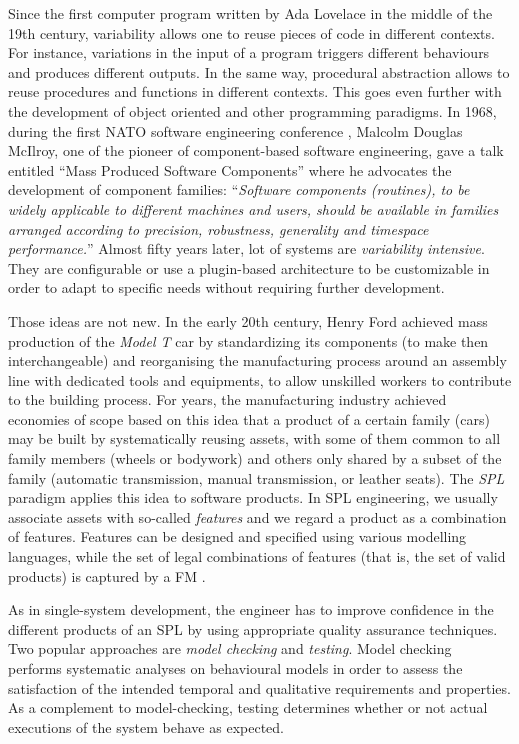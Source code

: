 
Since the first computer program written by Ada Lovelace in the middle of the 19th century, variability allows one to reuse pieces of code in different contexts. For instance, variations in the input of a program triggers different behaviours and produces different outputs. 
In the same way, procedural abstraction allows to reuse procedures and functions in different contexts. This goes even further with the development of object oriented and other programming paradigms. In 1968, during the first NATO software engineering conference \cite{Naur1969}, Malcolm Douglas McIlroy, one of the pioneer of component-based software engineering, gave a talk entitled ``Mass Produced Software Components'' \cite{Mcilroy1969} where he advocates the development of component families: ``\textit{Software components (routines), to be widely applicable to different machines and users, should be available in families arranged according to precision, robustness, generality and timespace performance.}''
Almost fifty years later, lot of systems are \emph{variability intensive}. They are configurable or use a plugin-based architecture to be customizable in order to adapt to specific needs without requiring further development.


Those ideas are not new. In the early 20th century, Henry Ford achieved mass production of the \textit{Model T} car by standardizing its components (to make then interchangeable) and reorganising the manufacturing process around an assembly line with dedicated tools and equipments, to allow unskilled workers to contribute to the building process.
For years, the manufacturing industry achieved eco\-no\-mies of scope based on this idea that a product of a certain family (\eg cars) may be built by systematically reusing assets, with some of them common to all family members (\eg wheels or bodywork) and others only shared by a subset of the family (\eg automatic transmission, manual transmission, or leather seats). The \emph{\gls{SPL}} paradigm \cite{Pohl2005} applies this idea to software products. In \gls{SPL} engineering, we usually associate assets with so-called \emph{features} and we regard a product as a combination of features. Features can be designed and specified using various modelling languages, while the set of legal combinations of features (that is, the set of valid products) is captured by a \acrfull{FM} \cite{Kang1990}.

As in single-system development, the engineer has to improve confidence in the different products of an \gls{SPL} by using appropriate quality assurance techniques. Two popular approaches are \emph{model checking} and \emph{testing}. Model checking~\cite{Clarke1999} performs systematic analyses on behavioural models in order to assess the satisfaction of the intended temporal and qualitative requirements and properties. As a complement to model-checking, testing \cite{Mathur2008} determines whether or not actual executions of the system behave as expected.

